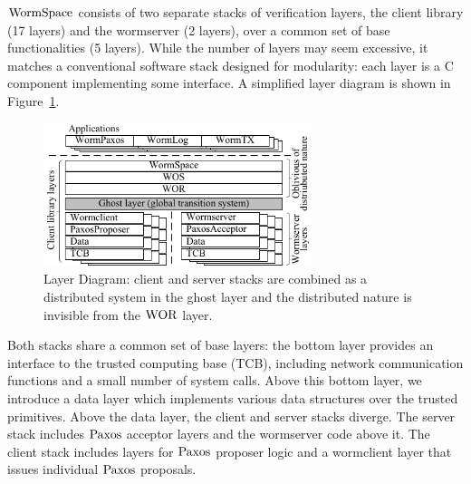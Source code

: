 $\mathrm{WormSpace}$ consists of two separate stacks of verification layers, the client library (17 layers) and the wormserver (2 layers), over a common set of base functionalities (5 layers). While the number of layers may seem excessive, it matches a conventional software stack designed for modularity: each layer is a C component implementing some interface. A simplified layer diagram is shown in Figure~\ref{fig:chapter:multipaxos:layerdiagram}.
\begin{figure}
\centering
\includegraphics[width=0.7\textwidth]{figs/multipaxos/layer_diagram.pdf}
\caption{Layer Diagram: client and server stacks are combined as a distributed system in the ghost layer and the distributed nature is invisible from the $\mathrm{WOR}$ layer.}
\label{fig:chapter:multipaxos:layerdiagram}
\end{figure}
Both stacks share a common set of base layers: 
the bottom layer provides an interface to the trusted computing base (TCB), 
including network communication functions and a small number of system calls. Above this bottom layer, 
we introduce a data layer which implements various data structures over the trusted primitives. 
Above the data layer, the client and server stacks diverge. 
The server stack includes $\mathrm{Paxos}$ acceptor layers and the wormserver code above it.
The client stack includes layers for $\mathrm{Paxos}$ proposer logic and a wormclient layer that issues individual $\mathrm{Paxos}$ proposals.

